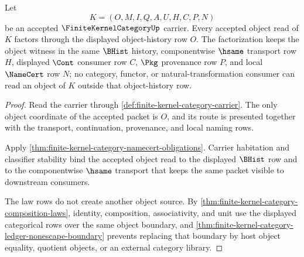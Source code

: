 \begin{theorem}
\label{thm:finite-kernel-category-object-row-totality}
Let
$$
K=(O,M,I,Q,A,U,H,C,P,N)
$$
be an accepted $\FiniteKernelCategoryUp$ carrier. Every accepted object read of
$K$ factors through the displayed object-history row $O$. The factorization
keeps the object witness in the same $\BHist$ history, componentwise $\hsame$
transport row $H$, displayed $\Cont$ consumer row $C$, $\Pkg$ provenance row
$P$, and local $\NameCert$ row $N$; no category, functor, or
natural-transformation consumer can read an object of $K$ outside that
object-history row.
\end{theorem}
\begin{proof}
Read the carrier through \autoref{def:finite-kernel-category-carrier}. The
only object coordinate of the accepted packet is $O$, and its route is
presented together with the transport, continuation, provenance, and local
naming rows.

Apply \autoref{thm:finite-kernel-category-namecert-obligations}. Carrier
habitation and classifier stability bind the accepted object read to the
displayed $\BHist$ row and to the componentwise $\hsame$ transport that keeps
the same packet visible to downstream consumers.

The law rows do not create another object source. By
\autoref{thm:finite-kernel-category-composition-laws}, identity, composition,
associativity, and unit use the displayed categorical rows over the same
object boundary, and \autoref{thm:finite-kernel-category-ledger-nonescape-boundary}
prevents replacing that boundary by host object equality, quotient objects, or
an external category library.
\end{proof}

